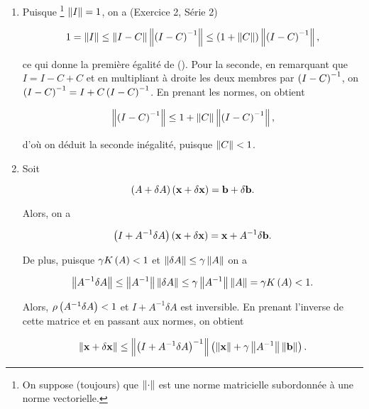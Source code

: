 \begin{enumerate}[label=\alph*)]
  \item Puisque \footnote{On suppose (toujours) que $\left\lVert\cdot\right\rVert$ est une norme matricielle subordonnée à une norme vectorielle.} $\left\lVert I\right\rVert = 1$, on a (Exercice 2, Série 2)
  
  \begin{equation*}
    1 = \left\lVert I\right\rVert
    \leq \left\lVert I - C\right\rVert \left\lVert\left(I - C\right)^{-1}\right\rVert
    \leq \left(1 + \left\lVert C\right\rVert\right) \left\lVert\left(I - C\right)^{-1}\right\rVert,
  \end{equation*}
  
  ce qui donne la première égalité de ().
  Pour la seconde, en remarquant que $I = I - C + C$ et en multipliant à droite les deux membres par $\left(I - C\right)^{-1}$, on $\left(I - C\right)^{-1} = I + C \left(I - C\right)^{-1}$.
  En prenant les normes, on obtient
  
  \begin{equation*}
    \left\lVert\left(I - C\right)^{-1}\right\rVert \leq 1 + \left\lVert C\right\rVert \left\lVert\left(I - C\right)^{-1}\right\rVert,
  \end{equation*}
  
  d'où on déduit la seconde inégalité, puisque $\left\lVert C\right\rVert < 1$.
  
  \item Soit
  
  \begin{equation*}
    \left(A + \delta A\right) \left(\mathbf{x} + \delta \mathbf{x}\right) = \mathbf{b} + \delta \mathbf{b}.
  \end{equation*}
  
  Alors, on a
  
  \begin{equation*}
    \left(I + A^{-1} \delta A\right) \left(\mathbf{x} + \delta \mathbf{x}\right) = \mathbf{x} + A^{-1} \delta \mathbf{b}.
  \end{equation*}
  
  De plus, puisque $\gamma K \left(A\right) < 1$ et $\left\lVert\delta A\right\rVert \leq \gamma \left\lVert A\right\rVert$ on a 
  
  \begin{equation*}
    \left\lVert A^{-1} \delta A\right\rVert
    \leq \left\lVert A^{-1}\right\rVert \left\lVert\delta A\right\rVert
    \leq \gamma \left\lVert A^{-1}\right\rVert \left\lVert A\right\rVert
    = \gamma K \left(A\right) < 1.
  \end{equation*}
  
  Alors, $\rho \left(A^{-1} \delta A\right) < 1$ et $I + A^{-1} \delta A$ est inversible.
  En prenant l'inverse de cette matrice et en passant aux normes, on obtient
  
  \begin{equation*}
    \left\lVert\mathbf{x} + \delta \mathbf{x}\right\rVert
    \leq \left\lVert\left(I + A^{-1} \delta A\right)^{-1}\right\rVert \left(\left\lVert\mathbf{x}\right\rVert + \gamma \left\lVert A^{-1}\right\rVert \left\lVert\mathbf{b}\right\rVert\right).
  \end{equation*}
  

\end{enumerate}
